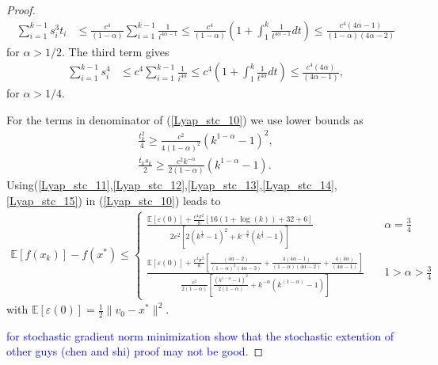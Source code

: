\documentclass{article}
\newcommand{\hcm}[1]{\textcolor{blue}{#1}}
\theoremstyle{plain}
\theoremstyle{definition}
\theoremstyle{remark}
\begin{document}
\begin{proof}
\begin{align}
            \sum_{i=1}^{k-1} s_i^3t_i&\leq \frac{c^4}{(1-\alpha)}\sum_{i=1}^{k-1} \frac{1}{i^{4\alpha -1}}\leq \frac{c^4}{(1-\alpha)}(1+\int_1^k\frac{1}{t^{4\alpha -1}}dt)\leq \frac{c^4(4\alpha -1)}{(1-\alpha)(4\alpha -2)}
         \end{align}
         for $\alpha > 1/2$. The third term gives
        \begin{align}\label{Lyap_stc_14}
            \sum_{i=1}^{k-1} s_i^4&\leq c^4\sum_{i=1}^{k-1} \frac{1}{i^{4\alpha }}\leq c^4(1+\int_1^k\frac{1}{t^{4\alpha }}dt)\leq \frac{c^4(4\alpha )}{(4\alpha -1)},
         \end{align} 
         for $\alpha > 1/4$.\par
         For the terms in denominator of (\ref{Lyap_stc_10}) we use lower bounds as
         \begin{align}\label{Lyap_stc_15}
             \frac{t_k^2}{4}\geq \frac{c^2}{4(1-\alpha)^2}(k^{1-\alpha}-1)^2,\nonumber\\
             \frac{t_ks_k}{2}\geq \frac{c^2k^{-\alpha}}{2(1-\alpha)}(k^{1-\alpha}-1).
         \end{align}
Using(\ref{Lyap_stc_11},\ref{Lyap_stc_12},\ref{Lyap_stc_13},\ref{Lyap_stc_14},\ref{Lyap_stc_15}) in (\ref{Lyap_stc_10}) leads to
\begin{align}\label{Lyap_stc_16}
    \mathbb E[f(x_k)]-f(x^*)\leq \left\{\begin{array}{lr}
         \frac{\mathbb E[\varepsilon (0)]+\frac{c^4\sigma^2}{8}\left[16(1+\log(k))+32+6\right]}{2c^2\left[2(k^{\frac{1}{4}}-1)^2+k^{-\frac{3}{4}}(k^{\frac{1}{4}}-1)\right]} & \quad \alpha=\frac{3}{4} \\
          \frac{\mathbb E[\varepsilon (0)]+\frac{c^4\sigma^2}{8}\left[\frac{(4\alpha -2)}{(1-\alpha)^2(4\alpha-3)}+\frac{4(4\alpha -1)}{(1-\alpha)(4\alpha -2)}+\frac{4(4\alpha )}{(4\alpha -1)}\right]}{\frac{c^2}{2(1-\alpha)}\left[\frac{(k^{1-\alpha}-1)^2}{2(1-\alpha)}+k^{-\alpha}(k^{(1-\alpha)}-1)\right]}& \quad 1>\alpha>\frac{3}{4}
    \end{array}\right.
\end{align}
with $\mathbb E[\varepsilon (0)]=\frac{1}{2}\|v_0-x^*\|^2$. 


\hcm{for stochastic gradient norm minimization show that the stochastic extention of other guys (chen and shi) proof may not be good.}


\end{proof}
\end{document}

